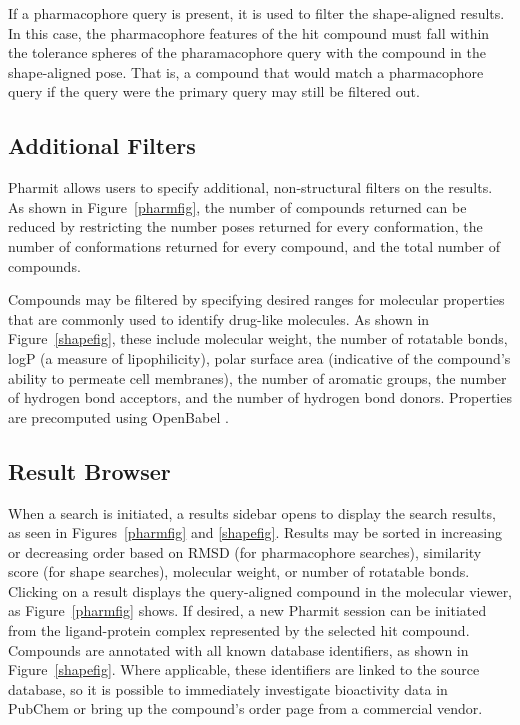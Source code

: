 If a pharmacophore query is present, it is used to filter the shape-aligned results. In this case, the pharmacophore features of the hit compound must fall within the tolerance spheres of the pharamacophore query with the compound in the shape-aligned pose. That is, a compound that would match a pharmacophore query if the query were the primary query may still be filtered out.
 
\subsection{Additional Filters}
Pharmit allows users to specify additional, non-structural filters on the results. As shown in Figure~\ref{pharmfig}, the number of compounds returned can be reduced by restricting the number poses returned for every conformation, the number of conformations returned for every compound, and the total number of compounds.

Compounds may be filtered by specifying desired ranges for molecular properties that are commonly used to identify drug-like molecules.
As shown in Figure~\ref{shapefig}, these include molecular weight, the number of rotatable bonds, logP (a measure of lipophilicity), polar surface area (indicative of the compound's ability to permeate cell membranes), the number of aromatic groups, the number of hydrogen bond acceptors, and the number of hydrogen bond donors.  Properties are precomputed using OpenBabel \cite{O_Boyle_2011}.

\subsection{Result Browser}
When a search is initiated, a results sidebar opens to display the search results, as seen in Figures~\ref{pharmfig} and \ref{shapefig}. Results may be sorted in increasing or decreasing order based on RMSD (for pharmacophore searches), similarity score (for shape searches), molecular weight, or number of rotatable bonds. Clicking on a result displays the query-aligned compound in the molecular viewer, as Figure~\ref{pharmfig} shows.  If desired, a new Pharmit session can be initiated from the ligand-protein complex represented by the selected hit compound.
Compounds are annotated with all known database identifiers, as shown in Figure~\ref{shapefig}. Where applicable, these identifiers are linked to the source database, so it is possible to immediately investigate bioactivity data in PubChem or bring up the compound's order page from a commercial vendor.